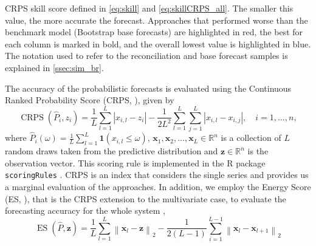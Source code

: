 \documentclass[a4paper,11pt]{article}
\newcommand{\xvet}{\bm{x}}
\newcommand{\zvet}{\bm{z}}
\theoremstyle{definition}
\begin{document}
\begin{table}[!t]
	\centering
	\begingroup
	\fontsize{9}{11}\selectfont
	
	\endgroup
	\caption{CRPS skill score defined in \eqref{eq:skill} and \eqref{eq:skillCRPS_all}. The smaller this value, the more accurate the forecast. Approaches that performed worse than the benchmark model (Bootstrap base forecasts) are highlighted in red, the best for each column is marked in bold, and the overall lowest value is highlighted in blue. The notation used to refer to the reconciliation and base forecast samples is explained in \autoref{ssec:sim_br}.}
	\label{tab:ar2crps}
\end{table}

The accuracy of the probabilistic forecasts is evaluated using the Continuous Ranked Probability Score (CRPS, \citealp{gneiting2014}), given by
\begin{equation}\label{eq:crps}
	\operatorname{CRPS}(\widehat{P}_i, z_i)=\frac{1}{L} \sum_{l=1}^{L}\left|x_{i,l}-z_i\right|-\frac{1}{2 L^{2}} \sum_{l=1}^{L} \sum_{j=1}^{L}\left|x_{i,l}-x_{i,j}\right|, \quad i = 1,\dots,n,
\end{equation}
where $\widehat{P}_i(\omega)=\frac{1}{L} \sum_{l=1}^{L} \mathbf{1}\left(x_{i,l} \leq \omega\right)$, $\xvet_{1}, \xvet_{2}, \dots, \xvet_{L}\in \mathbb{R}^{n}$ is a collection of $L$ random draws taken from the predictive distribution and $\zvet \in \mathbb{R}^{n}$ is the observation vector. This scoring rule is implemented in the R package \texttt{scoringRules} \citep{jordan2019}. CRPS is an index that considers the single series and provides us a marginal evaluation of the approaches.
In addition, we employ the Energy Score (ES, \citealp{gneiting2014}), that is the CRPS extension to the multivariate case, to evaluate the forecasting accuracy for the whole system \citep{wickramasuriya2021b, panagiotelis2023} ,
\begin{equation}\label{eq:es}
	\operatorname{ES}(\hat{P}, \zvet)=\frac{1}{L} \sum_{l=1}^{L}\left\|\xvet_{l}-\zvet\right\|_{2}-\frac{1}{2(L-1)} \sum_{i=1}^{L-1}\left\|\xvet_{l}-\xvet_{l+1}\right\|_{2}
\end{equation}
\end{document}
